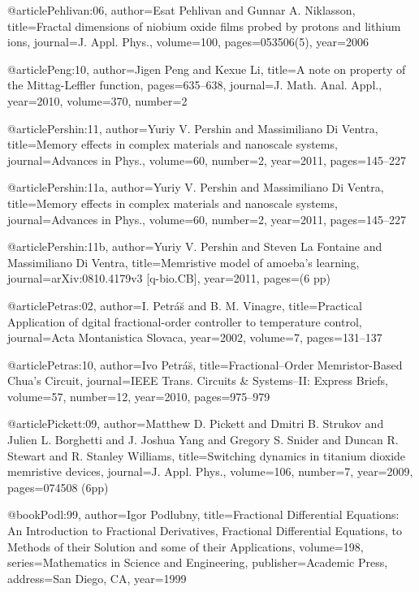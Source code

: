 \begin{thebibliography}{99}
@article{Pehlivan:06,
  author={Esat Pehlivan and Gunnar A. Niklasson},
  title={Fractal dimensions of niobium oxide films probed by protons and lithium
    ions},
  journal={J. Appl. Phys.},
  volume={100},
  pages={053506(5)},
  year={2006}
}

@article{Peng:10,
  author={Jigen Peng and Kexue Li},
  title={A note on property of the Mittag-Leffler function},
  pages={635--638},
  journal={J. Math. Anal. Appl.},
  year={2010},
  volume={370},
  number={2}
}

@article{Pershin:11,
  author={Yuriy V. Pershin and Massimiliano {Di Ventra}},
  title={Memory effects in complex materials and nanoscale systems},
  journal={Advances in Phys.},
  volume={60},
  number={2},
  year={2011},
  pages={145--227}
}

@article{Pershin:11a,
  author={Yuriy V. Pershin and Massimiliano {Di Ventra}},
  title={Memory effects in complex materials and nanoscale systems},
  journal={Advances in Phys.},
  volume={60},
  number={2},
  year={2011},
  pages={145--227}
}

@article{Pershin:11b,
  author={Yuriy V. Pershin and Steven La Fontaine and Massimiliano Di Ventra},
  title={Memristive model of amoeba's learning},
  journal={arXiv:0810.4179v3 [q-bio.CB]},
  year={2011},
  pages={(6 pp)}
}

@article{Petras:02,
  author={I. Petr{\'{a}}{\u{s}} and B. M. Vinagre},
  title={Practical Application of dgital fractional-order controller to temperature
    control},
  journal={Acta Montanistica Slovaca},
  year={2002},
  volume={7},
  pages={131--137}
}

@article{Petras:10,
  author={Ivo Petr{\'{a}}{\u{s}}},
  title={Fractional--Order Memristor-Based {C}hua's Circuit},
  journal={IEEE Trans. Circuits {\&} Systems--II: Express Briefs},
  volume={57},
  number={12},
  year={2010},
  pages={975--979}
}

@article{Pickett:09,
  author={Matthew D. Pickett and Dmitri B. Strukov and Julien L. Borghetti and
    J. Joshua Yang and Gregory S. Snider and Duncan R. Stewart and R. Stanley Williams},
  title={Switching dynamics in titanium dioxide memristive devices},
  journal={J. Appl. Phys.},
  volume={106},
  number={7},
  year={2009},
  pages={074508 (6pp)}
}

@book{Podl:99,
  author={Igor Podlubny},
  title={Fractional Differential Equations: An Introduction to Fractional Derivatives,
    Fractional Differential Equations, to Methods of their Solution and some of
    their Applications},
  volume={198},
  series={Mathematics in Science and Engineering},
  publisher={Academic Press},
  address={San Diego, CA},
  year={1999}
}


\end{thebibliography}
